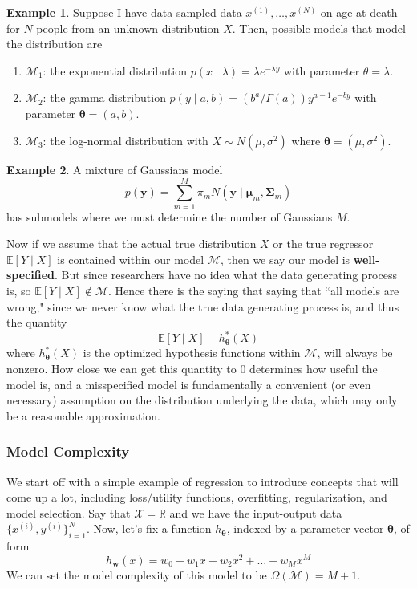 \documentclass{article}
\theoremstyle{definition}
\newtheorem{example}{Example}[section]
\theoremstyle{remark}
\theoremstyle{definition}
\begin{document}
\begin{example}
Suppose I have data sampled data $x^{(1)}, \ldots, x^{(N)}$ on age at death for $N$ people from an unknown distribution $X$. Then, possible models that model the distribution are 
\begin{enumerate}
    \item $\mathcal{M}_1$: the exponential distribution $p(x \mid \lambda) = \lambda e^{-\lambda y}$ with parameter $\theta = \lambda$. 
    \item $\mathcal{M}_2$: the gamma distribution $p(y \mid a, b) = (b^a / \Gamma(a)) y^{a - 1} e^{- by}$ with parameter $\boldsymbol{\theta} = (a, b)$. 
    \item $\mathcal{M}_3$: the log-normal distribution with $X \sim N (\mu, \sigma^2)$ where ${\boldsymbol{\theta}} = (\mu, \sigma^2)$. 
\end{enumerate}
\end{example}

\begin{example}
A mixture of Gaussians model 
\[p(\mathbf{y}) = \sum_{m=1}^M \pi_m N(\mathbf{y} \mid \boldsymbol{\mu}_m, \boldsymbol{\Sigma}_m )\]
has submodels where we must determine the number of Gaussians $M$. 
\end{example}

Now if we assume that the actual true distribution $X$ or the true regressor $\mathbb{E}[Y\mid X]$ is contained within our model $\mathcal{M}$, then we say our model is \textbf{well-specified}. But since researchers have no idea what the data generating process is, so $\mathbb{E}[Y\mid X] \not\in \mathcal{M}$. Hence there is the saying that saying that ``all models are wrong," since we never know what the true data generating process is, and thus the quantity 
\[\mathbb{E}[Y \mid X] - h_{\boldsymbol{\theta}}^\ast (X)\]
where $h_{\boldsymbol{\theta}}^\ast (X)$ is the optimized hypothesis functions within $\mathcal{M}$, will always be nonzero. How close we can get this quantity to $0$ determines how useful the model is, and a misspecified model is fundamentally a convenient (or even necessary) assumption on the distribution underlying the data, which may only be a reasonable approximation. 

\subsubsection{Model Complexity}

We start off with a simple example of regression to introduce concepts that will come up a lot, including loss/utility functions, overfitting, regularization, and model selection. Say that $\mathcal{X} = \mathbb{R}$ and we have the input-output data $\{x^{(i)}, y^{(i)}\}_{i=1}^N$. Now, let's fix a function $h_{\boldsymbol{\theta}}$, indexed by a parameter vector $\boldsymbol{\theta}$, of form 
\[h_\mathbf{w} (x) = w_0 + w_1 x + w_2 x^2 + \ldots + w_M x^M\]
We can set the model complexity of this model to be $\Omega(\mathcal{M}) = M + 1$. 
\end{document}
